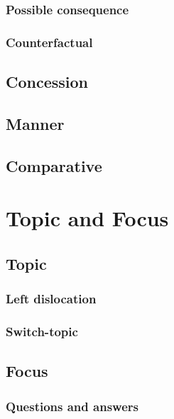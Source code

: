 \documentclass[oldfontcommands,oneside,a4paper,11pt]{memoir}
\begin{document}
\subsection{Possible consequence}


\subsection{Counterfactual}

\section{Concession}


\section{Manner}
 
\section{Comparative}
 


\chapter{Topic and Focus} \label{chapt:discourse} 

\section{Topic} \label{sec:topic}



\subsection{Left dislocation}
 

\subsection{Switch-topic}

\section{Focus}

\subsection{Questions and answers}
\end{document}
